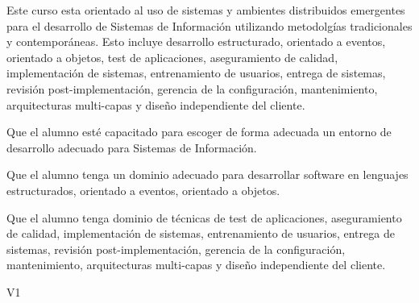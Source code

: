 \begin{syllabus}


\begin{justification}
	Este curso esta orientado al uso de sistemas y ambientes distribuidos emergentes para el desarrollo de Sistemas de Información utilizando metodolgías tradicionales y contemporáneas. Esto incluye desarrollo estructurado, orientado a eventos, orientado a objetos, test de aplicaciones, aseguramiento de calidad, implementación de sistemas, entrenamiento de usuarios, entrega de sistemas, revisión post-implementación, gerencia de la configuración, mantenimiento, arquitecturas multi-capas y diseño independiente del cliente.
	\end{justification}
	
	\begin{goals}
	\item Que el alumno esté capacitado para escoger de forma adecuada un entorno de desarrollo adecuado para Sistemas de Información.
	\item Que el alumno tenga un dominio adecuado para desarrollar software en lenguajes estructurados, orientado a eventos, orientado a objetos.
	\item Que el alumno tenga dominio de técnicas de test de aplicaciones, aseguramiento de calidad, implementación de sistemas, entrenamiento de usuarios, entrega de sistemas, revisión post-implementación, gerencia de la configuración, mantenimiento, arquitecturas multi-capas y diseño independiente del cliente.
	\end{goals}
	
	\begin{outcomes}{V1}
		\item {}
		\item {}
		\item {}
		\item {}
		\item {}
		\item {}
		\item {}
		\item {}
	\end{outcomes}
	

\end{syllabus}
